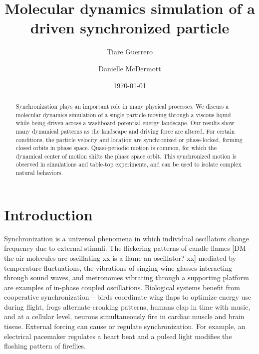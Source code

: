 \documentclass[preprint,showpacs,preprintnumbers,amsmath,amssymb,aps,prb]{revtex4-1}
\theoremstyle{remark}
\begin{document}
\title{Molecular dynamics simulation of a driven synchronized particle}

\author{Tiare Guerrero}

\author{Danielle McDermott}

\date{\today}

\begin{abstract}
  Synchronization
  plays an important role in many physical processes.
  We discuss a 
  molecular dynamics simulation
  of a single particle
  moving through
  a viscous liquid
  while being driven 
  across a washboard potential energy landscape.
  Our results show many dynamical patterns
  as the landscape and driving force are altered.
  For certain conditions,
  the particle velocity and location
  are synchronized or 
  phase-locked,
  forming closed orbits in phase space.
  Quasi-periodic motion is common, 
  for which the
  dynamical center of motion shifts the
  phase space orbit.
  This synchronized motion
  is
  observed in 
  simulations and table-top experiments,
  and
  can be used to isolate
  complex natural behaviors.
\end{abstract}

\maketitle 

\section{Introduction} 
Synchronization is a universal phenomena
in which
individual oscillators change frequency due
to external stimuli.\cite{Pikovsky2003}
The
flickering patterns of
candle flames [DM - the air molecules are oscillating xx is a flame an oscillator? xx]
mediated by temperature fluctuations,\cite{Okamoto2016}
the vibrations of singing wine glasses interacting 
through sound waves,\cite{Arane2009}
and metronomes vibrating through a supporting platform\cite{Jia2015}
are examples of in-phase coupled oscillations. 
Biological systems benefit from cooperative
synchronization --
birds coordinate wing flaps
to optimize energy use during flight,\cite{Portugal2014}
frogs alternate croaking patterns,\cite{Aihara2014}
humans clap in time with music,\cite{Tranchant2016}
and 
at a cellular level, 
neurons simultaneously fire in cardiac muscle\cite{MartinHall1999}
and brain tissue.\cite{Singer1999}
External forcing can cause or regulate 
synchronization. For example, 
an electrical pacemaker 
regulates a heart beat 
and 
a pulsed light modifies the
flashing pattern of fireflies. 
\end{document}
